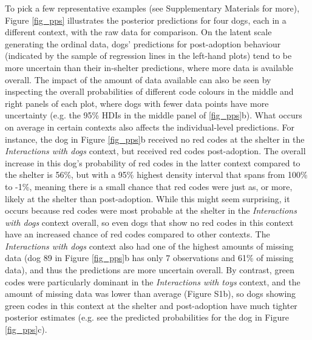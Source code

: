 \documentclass[12pt]{article}
\begin{document}
To pick a few representative examples (see Supplementary Materials for more), Figure \ref{fig_pps} illustrates the posterior predictions for four dogs, each in a different context, with the raw data for comparison. On the latent scale generating the ordinal data, dogs' predictions for post-adoption behaviour (indicated by the sample of regression lines in the left-hand plots) tend to be more uncertain than their in-shelter predictions, where more data is available overall. The impact of the amount of data available can also be seen by inspecting the overall probabilities of different code colours in the middle and right panels of each plot, where dogs with fewer data points have more uncertainty (e.g. the 95\% HDIs in the middle panel of \ref{fig_pps}b). What occurs on average in certain contexts also affects the individual-level predictions. For instance, the dog in Figure \ref{fig_pps}b received no red codes at the shelter in the \textit{Interactions with dogs} context, but received red codes post-adoption. The overall increase in this dog's probability of red codes in the latter context compared to the shelter is 56\%, but with a 95\% highest density interval that spans from 100\% to -1\%, meaning there is a small chance that red codes were just as, or more, likely at the shelter than post-adoption. While this might seem surprising, it occurs because red codes were most probable at the shelter in the \textit{Interactions with dogs} context overall, so even dogs that show no red codes in this context have an increased chance of red codes compared to other contexts. The \textit{Interactions with dogs} context also had one of the highest amounts of missing data (dog 89 in Figure \ref{fig_pps}b has only 7 observations and 61\% of missing data), and thus the predictions are more uncertain overall. By contrast, green codes were particularly dominant in the \textit{Interactions with toys} context, and the amount of missing data was lower than average (Figure S1b), so dogs showing green codes in this context at the shelter and post-adoption have much tighter posterior estimates (e.g. see the predicted probabilities for the dog in Figure \ref{fig_pps}c).
\end{document}
